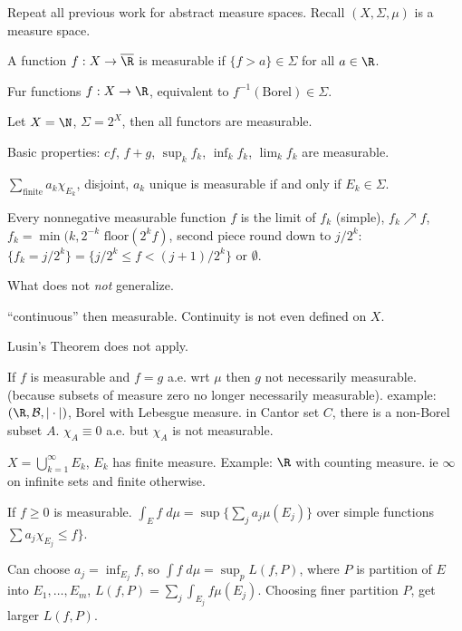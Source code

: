 Repeat all previous work for abstract measure spaces. Recall $(X, \Sigma, \mu)$ is a measure space. 

\begin{dfn}
A function $f: X \to \overline{\R}$ is measurable if $\{f>a\} \in \Sigma$ for all $a \in \R$. 
\end{dfn}

Fur functions $f: X \to \R$, equivalent to $f^{-1}(\text{Borel}) \in \Sigma$. 

\begin{ex}
Let $X= \N$, $\Sigma = 2^X$, then all functors are measurable.
\end{ex}

Basic properties: $cf$, $f+g$, $\sup_k f_k$, $\inf_k f_k$, $\lim_k f_k$ are measurable. 

$\sum_{\text{finite}} a_k \chi_{E_k}$, disjoint, $a_k$ unique is measurable if and only if $E_k \in \Sigma$. 

Every nonnegative measurable function $f$ is the limit of $f_k$ (simple), $f_k \nearrow f$, $f_k = \min(k, 2^{-k} \text{ floor}(2^k f)$, second piece round down to $j/2^k$: $\{f_k = j/2^k\} = \{ j/2^k \leq f< (j+1)/2^k\}$ or $\emptyset$. 

What does not \emph{not} generalize.

``continuous'' then measurable. Continuity is not even defined on $X$.

Lusin's Theorem does not apply.

If $f$ is measurable and $f=g$ a.e. wrt $\mu$ then $g$ not necessarily measurable. (because subsets of measure zero no longer necessarily measurable). example: $(\R, \mathcal{B}, |\cdot|)$, Borel with Lebesgue measure. in Cantor set $C$, there is a non-Borel subset $A$. $\chi_A \equiv 0$ a.e. but $\chi_A$ is not measurable. 


$X= \bigcup_{k=1}^\infty E_k$, $E_k$ has finite measure. Example: $\R$ with counting measure. ie $\infty$ on infinite sets and finite otherwise. 


\begin{dfn}
If $f \geq 0$ is measurable. $\int_E f \; d\mu = \sup\{ \sum_j a_j \mu(E_j) \}$ over simple functions $\sum a_j \chi_{E_j} \leq f \}$. 
\end{dfn}

Can choose $a_j = \inf_{E_j} f$, so $\int f \; d\mu= \sup_p L(f,P)$, where $P$ is partition of $E$ into $E_1, \ldots, E_m$, $L(f,P)= \sum_j \int_{E_j} f \mu(E_j)$. Choosing finer partition $P$, get larger $L(f,P)$. 


